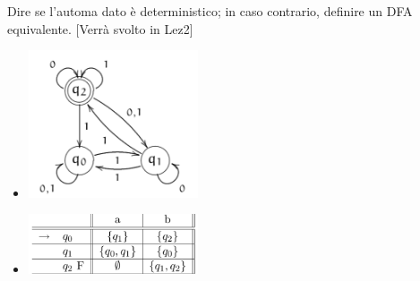 \documentclass[a4paper,11pt]{article}
\begin{document}
    Dire se l'automa dato è deterministico; in caso contrario, definire un DFA equivalente. [Verrà svolto in Lez2]
    \begin{itemize}
        \item \begin{minipage}{\linewidth}
            \centering
            \includegraphics[width=5cm]{Fig1.png}
        \end{minipage}
        \item \begin{minipage}{\linewidth}
            \centering
            \includegraphics[width=5cm]{Fig2.png}
        \end{minipage}
    \end{itemize}
\end{document}
